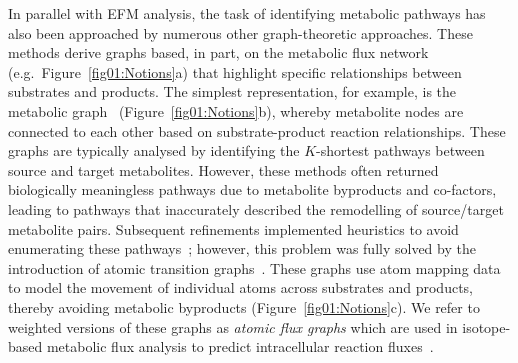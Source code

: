 \documentclass[12pt]{article}
\begin{document}
In parallel with EFM analysis, the task of identifying metabolic
pathways has also been approached by numerous other graph-theoretic
approaches. These methods derive graphs based, in part, on the metabolic
flux network (e.g.\ Figure~\ref{fig01:Notions}a) that highlight specific
relationships between substrates and products. The simplest
representation, for example, is the metabolic
graph~\citep{AritaMasanori2000Mrus,WagnerAndreas2001Tswi}
(Figure~\ref{fig01:Notions}b), whereby metabolite nodes are connected to
each other based on substrate-product reaction relationships. These graphs
are typically analysed by identifying the $K$-shortest pathways between
source and target metabolites. However, these methods often returned
biologically meaningless pathways due to metabolite byproducts and
co-factors, leading to pathways that inaccurately described the
remodelling of source/target metabolite pairs. Subsequent
refinements implemented heuristics to avoid enumerating these
pathways~\citep{McShanD2003PathMiner,RahmanSA2004Mpaw,CroesDidier2006IMPi,PeyJon2011Pfma,HafnerJasmin2021NFmp};
however, this problem was fully solved by the introduction of atomic
transition graphs~\citep{AritaMasanori2003ISAT}. These graphs use
atom mapping data to model the movement of individual atoms across
substrates and products, thereby avoiding metabolic byproducts
(Figure~\ref{fig01:Notions}c). We refer to weighted versions of these
graphs as \emph{atomic flux graphs} which are used in isotope-based
metabolic flux analysis to predict intracellular reaction
fluxes~\citep{WiechertWolfgang1999Brsi,WeitzelMichael2007Ttom}.




\end{document}
